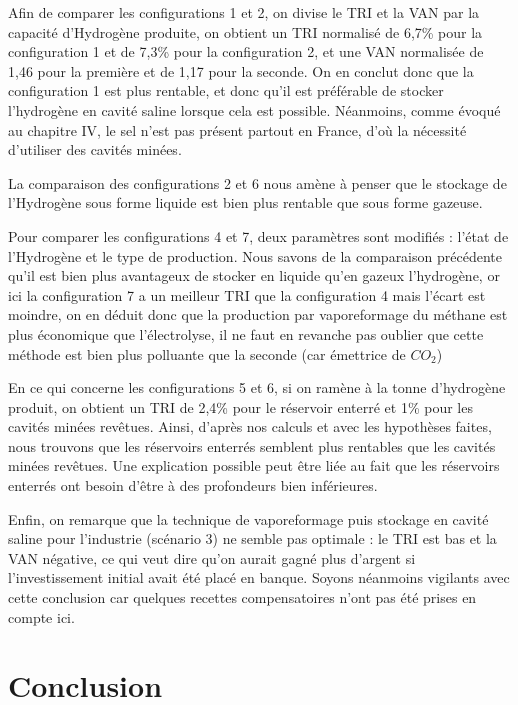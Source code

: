 \documentclass[11pt,french,a4paper]{article}
\begin{document}
Afin de comparer les configurations 1 et 2, on divise le TRI et la VAN par la capacité d’Hydrogène produite, on obtient un TRI normalisé de 6,7\% pour la configuration 1 et de 7,3\% pour la configuration 2, et une VAN normalisée de 1,46 pour la première et de 1,17 pour la seconde. On en conclut donc que la configuration 1 est plus rentable, et donc qu’il est préférable de stocker l'hydrogène en cavité saline lorsque cela est possible. Néanmoins, comme évoqué au chapitre IV, le sel n’est pas présent partout en France, d’où la nécessité d’utiliser des cavités minées.  

La comparaison des configurations 2 et 6 nous amène à penser que le stockage de l’Hydrogène sous forme liquide est bien plus rentable que sous forme gazeuse. 

Pour comparer les configurations 4 et 7, deux paramètres sont modifiés : l’état de l’Hydrogène et le type de production. Nous savons de la comparaison précédente qu’il est bien plus avantageux de stocker en liquide qu’en gazeux l’hydrogène, or ici la configuration 7 a un meilleur TRI que la configuration 4 mais l’écart est moindre, on en déduit donc que la production par vaporeformage du méthane est plus économique que l’électrolyse, il ne faut en revanche pas oublier que cette méthode est bien plus polluante que la seconde (car émettrice de $CO_2$) 

En ce qui concerne les configurations 5 et 6, si on ramène à la tonne d’hydrogène produit, on obtient un TRI de 2,4\% pour le réservoir enterré et 1\% pour les cavités minées revêtues. Ainsi, d’après nos calculs et avec les hypothèses faites, nous trouvons que les réservoirs enterrés semblent plus rentables que les cavités minées revêtues. Une explication possible peut être liée au fait que les réservoirs enterrés ont besoin d’être à des profondeurs bien inférieures.  

Enfin, on remarque que la technique de vaporeformage puis stockage en cavité saline pour l’industrie (scénario 3) ne semble pas optimale : le TRI est bas et la VAN négative, ce qui veut dire qu’on aurait gagné plus d’argent si l’investissement initial avait été placé en banque. Soyons néanmoins vigilants avec cette conclusion car quelques recettes compensatoires n’ont pas été prises en compte ici. 






\section*{Conclusion}  
\end{document}
